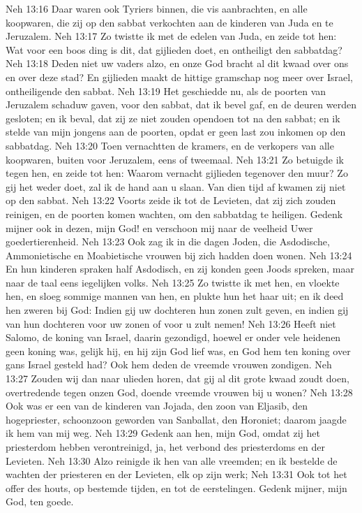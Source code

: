 Neh 13:16  Daar waren ook Tyriers binnen, die vis aanbrachten, en alle koopwaren, die zij op den sabbat verkochten aan de kinderen van Juda en te Jeruzalem.
Neh 13:17  Zo twistte ik met de edelen van Juda, en zeide tot hen: Wat voor een boos ding is dit, dat gijlieden doet, en ontheiligt den sabbatdag?
Neh 13:18  Deden niet uw vaders alzo, en onze God bracht al dit kwaad over ons en over deze stad? En gijlieden maakt de hittige gramschap nog meer over Israel, ontheiligende den sabbat.
Neh 13:19  Het geschiedde nu, als de poorten van Jeruzalem schaduw gaven, voor den sabbat, dat ik bevel gaf, en de deuren werden gesloten; en ik beval, dat zij ze niet zouden opendoen tot na den sabbat; en ik stelde van mijn jongens aan de poorten, opdat er geen last zou inkomen op den sabbatdag.
Neh 13:20  Toen vernachtten de kramers, en de verkopers van alle koopwaren, buiten voor Jeruzalem, eens of tweemaal.
Neh 13:21  Zo betuigde ik tegen hen, en zeide tot hen: Waarom vernacht gijlieden tegenover den muur? Zo gij het weder doet, zal ik de hand aan u slaan. Van dien tijd af kwamen zij niet op den sabbat.
Neh 13:22  Voorts zeide ik tot de Levieten, dat zij zich zouden reinigen, en de poorten komen wachten, om den sabbatdag te heiligen. Gedenk mijner ook in dezen, mijn God! en verschoon mij naar de veelheid Uwer goedertierenheid.
Neh 13:23  Ook zag ik in die dagen Joden, die Asdodische, Ammonietische en Moabietische vrouwen bij zich hadden doen wonen.
Neh 13:24  En hun kinderen spraken half Asdodisch, en zij konden geen Joods spreken, maar naar de taal eens iegelijken volks.
Neh 13:25  Zo twistte ik met hen, en vloekte hen, en sloeg sommige mannen van hen, en plukte hun het haar uit; en ik deed hen zweren bij God: Indien gij uw dochteren hun zonen zult geven, en indien gij van hun dochteren voor uw zonen of voor u zult nemen!
Neh 13:26  Heeft niet Salomo, de koning van Israel, daarin gezondigd, hoewel er onder vele heidenen geen koning was, gelijk hij, en hij zijn God lief was, en God hem ten koning over gans Israel gesteld had? Ook hem deden de vreemde vrouwen zondigen.
Neh 13:27  Zouden wij dan naar ulieden horen, dat gij al dit grote kwaad zoudt doen, overtredende tegen onzen God, doende vreemde vrouwen bij u wonen?
Neh 13:28  Ook was er een van de kinderen van Jojada, den zoon van Eljasib, den hogepriester, schoonzoon geworden van Sanballat, den Horoniet; daarom jaagde ik hem van mij weg.
Neh 13:29  Gedenk aan hen, mijn God, omdat zij het priesterdom hebben verontreinigd, ja, het verbond des priesterdoms en der Levieten.
Neh 13:30  Alzo reinigde ik hen van alle vreemden; en ik bestelde de wachten der priesteren en der Levieten, elk op zijn werk;
Neh 13:31  Ook tot het offer des houts, op bestemde tijden, en tot de eerstelingen. Gedenk mijner, mijn God, ten goede.



